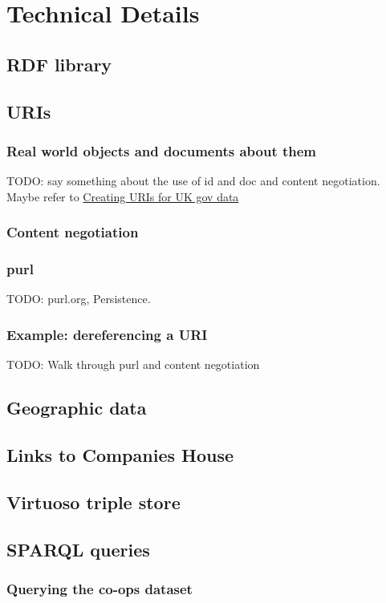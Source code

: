 \documentclass[11pt,twoside,a4paper]{article}
\begin{document}
\section{Technical Details}
    \subsection{RDF library}
    \subsection{URIs}
    \subsubsection{Real world objects and documents about them}
    TODO: say something about the use of id and doc and content negotiation.
    Maybe refer to \href{https://data.gov.uk/resources/uris}{Creating URIs for UK gov data}
    \subsubsection{Content negotiation}
    \subsubsection{purl}
    TODO: purl.org, Persistence.
    \subsubsection{Example: dereferencing a URI}
    TODO: Walk through purl and content negotiation
    \subsection{Geographic data}
    \label{sec:tech:os}
    \subsection{Links to Companies House}
    \label{sec:tech:ch}
    \subsection{Virtuoso triple store}
    \subsection{SPARQL queries}
    \subsubsection{Querying the co-ops dataset}
\end{document}
